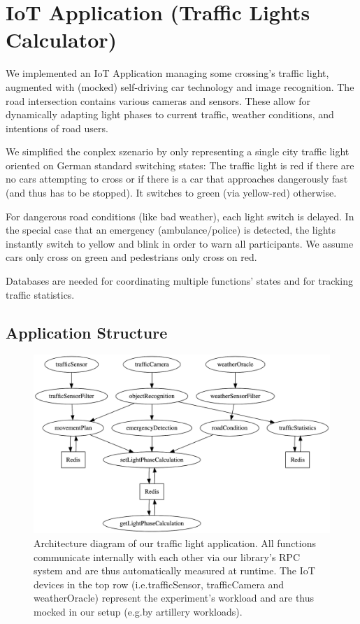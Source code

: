 \documentclass[../main.tex]{subfiles}
\begin{document}
\section{IoT Application (Traffic Lights Calculator)}\label{sec:webshop}

We implemented an IoT Application managing some crossing's traffic light, 
augmented with (mocked) self-driving car technology and image recognition. 
The road intersection contains various cameras and sensors. 
These allow for dynamically adapting light phases to current traffic, 
weather conditions, and intentions of road users. 

We simplified the conplex szenario by only representing a single city traffic light oriented on German standard switching states:
The traffic light is red if there are no cars attempting to cross 
or if there is a car that approaches dangerously fast (and thus has to be stopped). 
It switches to green (via yellow-red) otherwise. 

For dangerous road conditions (like bad weather), each light switch is delayed. 
In the special case that an emergency (ambulance/police) is detected, 
the lights instantly switch to yellow and blink 
in order to warn all participants. 
We assume cars only cross on green and pedestrians only cross on red.

Databases are needed for coordinating multiple functions' states
and for tracking traffic statistics.


\subsection{Application Structure}\label{ssec:webshopApplicationStructure}

\begin{figure}
\begin{center}
  \includegraphics[width=\linewidth,keepaspectratio]{./iot-architecture-diagram.png}
\end{center}
\caption[IoT Architecture Diagram]{%
  Architecture diagram of our traffic light application.
  All functions communicate internally with each other via our library's RPC system
  and are thus automatically measured at runtime.
  The IoT devices in the top row (i.e.\@ trafficSensor, trafficCamera and weatherOracle) 
  represent the experiment's workload and are thus mocked in our setup (e.g.\@ by artillery workloads).%
}%
\label{fig:iotArchitectureDiagram}
\end{figure}
\end{document}
